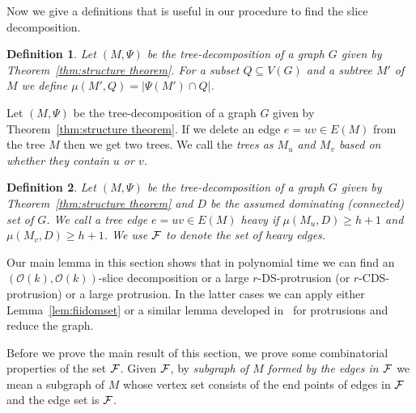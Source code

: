 \documentclass[11pt]{article}
\newtheorem{definition}{Definition}
\newcommand{\cO}{\mathcal{O}}
\begin{document}
 Now we give a definitions that is useful in our procedure to find  the slice decomposition. 
\begin{definition}
Let $(M,\Psi)$ be the tree-decomposition of a graph $G$ given by  Theorem~\ref{thm:structure theorem}. For a subset 
$Q\subseteq V(G)$ and a subtree $M'$ of $M$ we define $\mu(M',Q)=|\Psi(M')\cap Q|$.  
\end{definition}

Let $(M,\Psi)$ be the tree-decomposition of a graph $G$ given by  Theorem~\ref{thm:structure theorem}.   
If we delete an edge $e=uv\in E(M)$ from the tree $M$ then 
we get two trees. We call the {\em trees as $M_u$ and $M_v$ based on whether they contain $u$ or $v$. } 

\begin{definition}
Let $(M,\Psi)$ be the tree-decomposition of a graph $G$ given by  Theorem~\ref{thm:structure theorem} and $D$ be the assumed dominating (connected) set of $G$.  We call a tree edge $e=uv\in E(M)$ 
{\em heavy} if $\mu(M_u,D)\geq h+1$ and $\mu(M_v,D)\geq h+1$. We use $\cal F$ to denote the set of heavy edges.  
\end{definition}







Our main lemma in this section shows that in polynomial time we can find an $(\cO(k),\cO(k))$-slice decomposition or 
a large $r$-{\sc DS}-protrusion (or $r$-{\sc CDS}-protrusion) or a large protrusion. In the latter cases we can apply either 
Lemma~\ref{lem:fiidomset} or a similar lemma developed in~\cite[Lemma~7]{H.Bodlaender:2009ng} for protrusions and reduce the graph.  






Before we prove the main result of this section, we prove some combinatorial properties of the set $\cal F$.  Given $\cal F$, by {\em subgraph of $M$ formed by the edges in $\cal F$} we mean a subgraph of $M$ whose vertex set consists of the end points of edges in $\cal F$ and the edge set is $\cal F$. 
\end{document}
